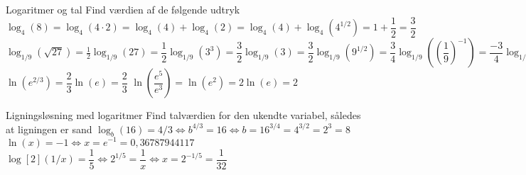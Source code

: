 \begin{opgave}[1]{Logaritmer og tal}
    Find værdien af de følgende udtryk
    \opg $\log_4(8) = \log_4(4\cdot 2) = \log_4(4)+\log_4(2) = \log_4(4)+\log_4(4^{1/2}) = 1+\dfrac{1}{2} = \dfrac{3}{2}$
    \opg $\log_{1/9} \left(\sqrt{27}\right) = \frac{1}{2}\log_{1/9}\left(27\right) = \dfrac{1}{2}\log_{1/9}\left(3^3\right) = \dfrac{3}{2}\log_{1/9}\left(3\right) = \dfrac{3}{2}\log_{1/9}\left(9^{1/2}\right) = \dfrac{3}{4}\log_{1/9}\left(\left(\dfrac{1}{9}\right)^{-1}\right) = \dfrac{-3}{4}\log_{1/9}\left(\dfrac{1}{9}\right) = -\dfrac{3}{4}$
    \opg $\ln(e^{2/3}) = \dfrac{2}{3}\ln(e) = \dfrac{2}{3}$
    \opg $\ln(\dfrac{e^5}{e^3}) = \ln(e^2) = 2\ln(e) = 2$
\end{opgave}

\begin{opgave}[2]{Ligningsløsning med logaritmer}
Find talværdien for den ukendte variabel, således at ligningen er sand
    \opg $\log_b(16) = 4/3 \iff b^{4/3}=16 \iff b=16^{3/4}=4^{3/2}=2^3=8$
    \opg $\ln(x) = -1 \iff x=e^{-1}=0,36787944117$
    \opg $\log[2](1/x) = \dfrac{1}{5}\iff 2^{1/5} = \dfrac{1}{x} \iff x = 2^{-1/5} = \dfrac{1}{32}$
\end{opgave}


